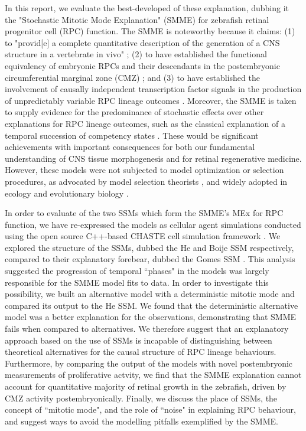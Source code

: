 \documentclass{ut-thesis}
\begin{document}
\begin{NoHyper}
In this report, we evaluate the best-developed of these explanation, dubbing it the "Stochastic Mitotic Mode Explanation" (SMME) for zebrafish retinal progenitor cell (RPC) function. The SMME is noteworthy because it claims: (1) to "provid[e] a complete quantitative description of the generation of a CNS structure in a vertebrate in vivo" \cite{He2012}; (2) to have established the functional equivalency of embryonic RPCs and their descendants in the postembryonic circumferential marginal zone (CMZ) \cite{Wan2016}; and (3) to have established the involvement of causally independent transcription factor signals in the production of unpredictably variable RPC lineage outcomes \cite{Boije2015}. Moreover, the SMME is taken to supply evidence for the predominance of stochastic effects over other explanations for RPC lineage outcomes, such as the classical explanation of a temporal succession of competency states \cite{Temple1986}. These would be significant achievements with important consequences for both our fundamental understanding of CNS tissue morphogenesis and for retinal regenerative medicine. However, these models were not subjected to model optimization or selection procedures, as advocated by model selection theorists \cite{Burnham2002}, and widely adopted in ecology and evolutionary biology \cite{Johnson2004}.

In order to evaluate of the two SSMs which form the SMME's MEx for RPC function, we have re-expressed the models as cellular agent simulations conducted using the open source C++-based CHASTE cell simulation framework \cite{Mirams2013}. We explored the structure of the SSMs, dubbed the He and Boije SSM respectively, compared to their explanatory forebear, dubbed the Gomes SSM \cite{Gomes2011}. This analysis suggested the progression of temporal ``phases" in the models was largely responsible for the SMME model fits to data. In order to investigate this possibility, we built an alternative model with a deterministic mitotic mode and compared its output to the He SSM. We found that the deterministic alternative model was a better explanation for the observations, demonstrating that SMME fails when compared to alternatives. We therefore suggest that an explanatory approach based on the use of SSMs is incapable of distinguishing between theoretical alternatives for the causal structure of RPC lineage behaviours. Furthermore, by comparing the output of the models with novel postembryonic measurements of proliferative actvity, we find that the SMME explanation cannot account for quantitative majority of retinal growth in the zebrafish, driven by CMZ activity postembryonically. Finally, we discuss the place of SSMs, the concept of ``mitotic mode", and the role of ``noise" in explaining RPC behaviour, and suggest ways to avoid the modelling pitfalls exemplified by the SMME.


\end{NoHyper}
\end{document}
